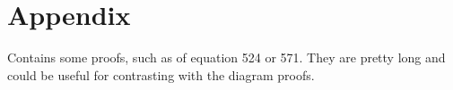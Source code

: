 
\chapter{Appendix}
Contains some proofs, such as of equation 524 or 571.
They are pretty long and could be useful for contrasting with the diagram proofs.
